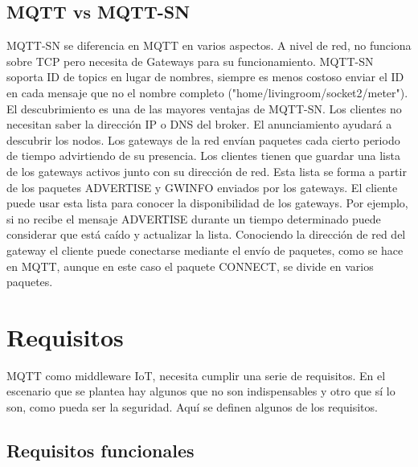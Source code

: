 \documentclass[12pt, twoside]{book}
\begin{document}
\subsection{MQTT vs MQTT-SN}
MQTT-SN se diferencia en MQTT en varios aspectos. A nivel de red, no funciona sobre TCP pero necesita de Gateways para su funcionamiento.
MQTT-SN soporta ID de topics en lugar de nombres, siempre es menos costoso enviar el ID en cada mensaje que no el nombre completo ("home/livingroom/socket2/meter"). \\
El descubrimiento es una de las mayores ventajas de MQTT-SN. Los clientes no necesitan saber la dirección IP o DNS del broker. El anunciamiento ayudará a descubrir los nodos. Los gateways de la red envían paquetes cada cierto periodo de tiempo advirtiendo de su presencia. Los clientes tienen que guardar una lista de los gateways activos junto con su dirección de red. Esta lista se forma a partir de los paquetes ADVERTISE y GWINFO enviados por los gateways. El cliente puede usar esta lista para conocer la disponibilidad de los gateways. Por ejemplo, si no recibe el mensaje ADVERTISE durante un tiempo determinado puede considerar que está caído y actualizar la lista. Conociendo la dirección de red del gateway el cliente puede conectarse mediante el envío de paquetes, como se hace en MQTT, aunque en este caso el paquete CONNECT, se divide en varios paquetes.\\


\section{Requisitos}
MQTT como middleware IoT, necesita cumplir una serie de requisitos. En el escenario que se plantea hay algunos que no son indispensables y otro que sí lo son, como pueda ser la seguridad. Aquí se definen algunos de los requisitos.
\subsection{Requisitos funcionales}
\end{document}

